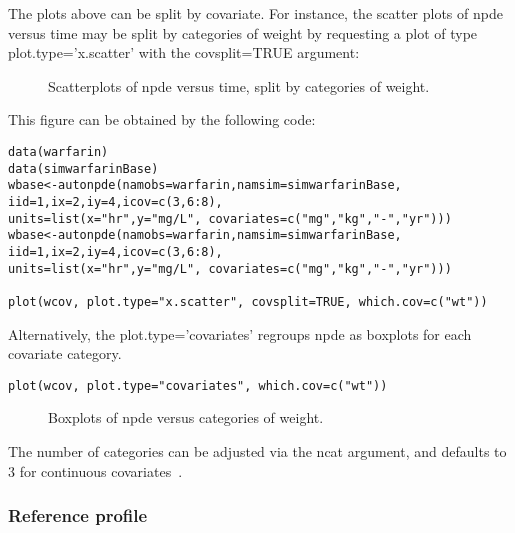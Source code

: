 \hskip 18pt The plots above can be split by covariate. For instance, the scatter plots of npde versus time may be split by categories of weight by requesting a plot of type {\sf plot.type='x.scatter'} with the {\sf covsplit=TRUE} argument:

\begin{figure}[!h]
\begin{center}
\end{center}
\caption{Scatterplots of npde versus time, split by categories of weight.}\label{fig:warfCovsplitXScatter}
\end{figure}

This figure can be obtained by the following code:
\begin{verbatim}
data(warfarin)
data(simwarfarinBase)
wbase<-autonpde(namobs=warfarin,namsim=simwarfarinBase, iid=1,ix=2,iy=4,icov=c(3,6:8),
units=list(x="hr",y="mg/L", covariates=c("mg","kg","-","yr")))
wbase<-autonpde(namobs=warfarin,namsim=simwarfarinBase, iid=1,ix=2,iy=4,icov=c(3,6:8),
units=list(x="hr",y="mg/L", covariates=c("mg","kg","-","yr")))

plot(wcov, plot.type="x.scatter", covsplit=TRUE, which.cov=c("wt"))
\end{verbatim} 

Alternatively, the {\sf plot.type='covariates'} regroups npde as boxplots for each covariate category.
\begin{verbatim}
plot(wcov, plot.type="covariates", which.cov=c("wt"))
\end{verbatim} 

\begin{figure}[!h]
\par\kern -0.2cm
\begin{center}
\end{center}
\caption{Boxplots of npde versus categories of weight.}\label{fig:warfBoxCov}
\end{figure}

The number of categories can be adjusted via the {\sf ncat} argument, and defaults to 3 for continuous covariates~\cite{Brendel10}.


\subsubsection{Reference profile}

